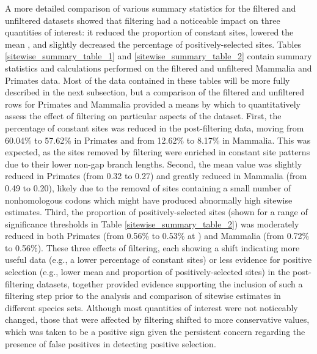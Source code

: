 A more detailed comparison of various summary statistics for the
filtered and unfiltered datasets showed that filtering had a
noticeable impact on three quantities of interest: it reduced the
proportion of constant sites, lowered the mean \omg, and slightly
decreased the percentage of positively-selected sites. Tables
\ref{sitewise_summary_table_1} and \ref{sitewise_summary_table_2}
contain summary statistics and calculations performed on the filtered
and unfiltered Mammalia and Primates data. Most of the data contained
in these tables will be more fully described in the next subsection,
but a comparison of the filtered and unfiltered rows for Primates and
Mammalia provided a means by which to quantitatively assess the effect
of filtering on particular aspects of the dataset. First, the
percentage of constant sites was reduced in the post-filtering data,
moving from 60.04\% to 57.62\% in Primates and from 12.62\% to 8.17\%
in Mammalia. This was expected, as the sites removed by filtering were
enriched in constant site patterns due to their lower non-gap branch
lengths. Second, the mean \omg value was slightly reduced in Primates
(from 0.32 to 0.27) and greatly reduced in Mammalia (from 0.49 to
0.20), likely due to the removal of sites containing a small number of
nonhomologous codons which might have produced abnormally high
sitewise \ml \omg estimates. Third, the proportion of
positively-selected sites (shown for a range of significance
thresholds in Table \ref{sitewise_summary_table_2}) was moderately
reduced in both Primates (from 0.56\% to 0.53\% at ) and
Mammalia (from 0.72\% to 0.56\%). These three effects of filtering,
each showing a shift indicating more useful data (e.g., a lower
percentage of constant sites) or less evidence for positive selection
(e.g., lower mean \omg and proportion of positively-selected sites) in
the post-filtering datasets, together provided evidence supporting the
inclusion of such a filtering step prior to the analysis and
comparison of sitewise estimates in different species sets. Although
most quantities of interest were not noticeably changed, those that
were affected by filtering shifted to more conservative values, which
was taken to be a positive sign given the persistent concern regarding
the presence of false positives in detecting positive selection.

